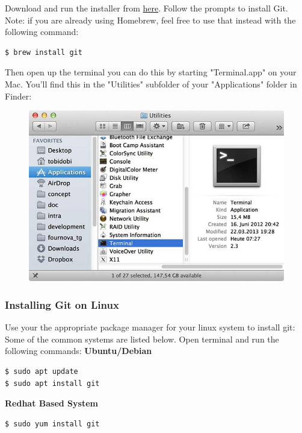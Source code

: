 \documentclass{article}
\begin{document}
Download and run the installer from \href{https://sourceforge.net/projects/git-osx-installer/files/}{here}.
Follow the prompts to install Git.
\newline\newline
Note: if you are already using Homebrew, feel free to use that instead with the following command:
\begin{lstlisting}[language=bash]
$ brew install git
\end{lstlisting}
Then open up the terminal you can do this by starting "Terminal.app" on your Mac. You'll find this in the "Utilities" subfolder of your "Applications" folder in Finder:

\begin{figure}[h]
    \centering
    \includegraphics[width=4.5in]{images/terminal-app-mac.jpg}
\end{figure}



\subsubsection{Installing Git on Linux}
Use your the appropriate package manager for your linux system to install git:
\newline\newline
Some of the common systems are listed below.
\newline\newline
Open terminal and run the following commands:
\newline
\textbf{Ubuntu/Debian}

\begin{lstlisting}[language=bash]
$ sudo apt update
$ sudo apt install git
\end{lstlisting}

\textbf{Redhat Based System}
\begin{lstlisting}[language=bash]
$ sudo yum install git
\end{lstlisting}
\end{document}
